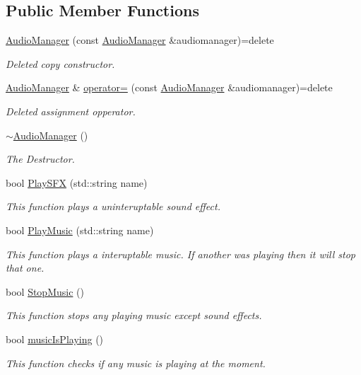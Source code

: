 \subsection*{Public Member Functions}
\begin{DoxyCompactItemize}
\item 
\hyperlink{class_audio_manager_a008a2bea57103294f092e3bd1f9d84da}{Audio\-Manager} (const \hyperlink{class_audio_manager}{Audio\-Manager} \&audiomanager)=delete
\begin{DoxyCompactList}\small\item\em Deleted copy constructor. \end{DoxyCompactList}\item 
\hyperlink{class_audio_manager}{Audio\-Manager} \& \hyperlink{class_audio_manager_af9245601e53c1584a3d7abef1aaefced}{operator=} (const \hyperlink{class_audio_manager}{Audio\-Manager} \&audiomanager)=delete
\begin{DoxyCompactList}\small\item\em Deleted assignment opperator. \end{DoxyCompactList}\item 
\hyperlink{class_audio_manager_ad94dc46723c6d7cf8c81fc3772a842aa}{$\sim$\-Audio\-Manager} ()
\begin{DoxyCompactList}\small\item\em The Destructor. \end{DoxyCompactList}\item 
bool \hyperlink{class_audio_manager_ad200f850f1289b15d3234d89f57206bb}{Play\-S\-F\-X} (std\-::string name)
\begin{DoxyCompactList}\small\item\em This function plays a uninteruptable sound effect. \end{DoxyCompactList}\item 
bool \hyperlink{class_audio_manager_ad408d456071f30e96a36893a0ad1d2f8}{Play\-Music} (std\-::string name)
\begin{DoxyCompactList}\small\item\em This function plays a interuptable music. If another was playing then it will stop that one. \end{DoxyCompactList}\item 
bool \hyperlink{class_audio_manager_a893d9756eef3f2b562b0a337227e7c9d}{Stop\-Music} ()
\begin{DoxyCompactList}\small\item\em This function stops any playing music except sound effects. \end{DoxyCompactList}\item 
bool \hyperlink{class_audio_manager_a908b5114da8a03c6d7db0f81c4f0ec8e}{music\-Is\-Playing} ()
\begin{DoxyCompactList}\small\item\em This function checks if any music is playing at the moment. \end{DoxyCompactList}\end{DoxyCompactItemize}
